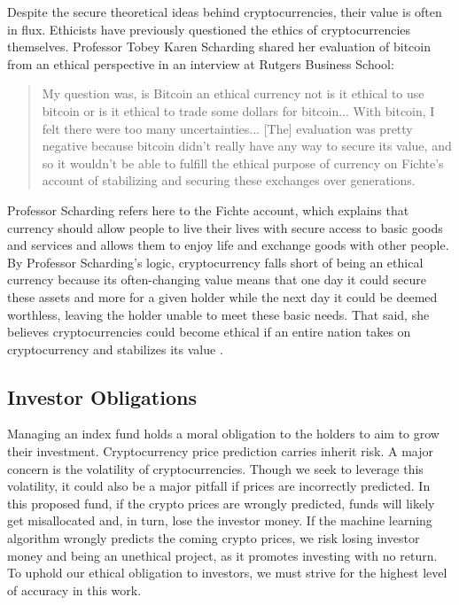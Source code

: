 \documentclass[10pt,twocolumn]{article}
\begin{document}
Despite the secure theoretical ideas behind cryptocurrencies, their value is often in flux. Ethicists have previously questioned the ethics of cryptocurrencies themselves. Professor Tobey Karen Scharding shared her evaluation of bitcoin from an ethical perspective in an interview at Rutgers Business School:

\begin{quote}
    My question was, is Bitcoin an ethical currency not is it ethical to use bitcoin or is it ethical to trade some dollars for bitcoin... With bitcoin, I felt there were too many uncertainties... [The] evaluation was pretty negative because bitcoin didn't really have any way to secure its value, and so it wouldn't be able to fulfill the ethical purpose of currency on Fichte's account of stabilizing and securing these exchanges over generations. \cite{IsBitcoinEthical}
\end{quote}

Professor Scharding refers here to the Fichte account, which explains that currency should allow people to live their lives with secure access to basic goods and services and allows them to enjoy life and exchange goods with other people. By Professor Scharding's logic, cryptocurrency falls short of being an ethical currency because its often-changing value means that one day it could secure these assets and more for a given holder while the next day it could be deemed worthless, leaving the holder unable to meet these basic needs. That said, she believes cryptocurrencies could become ethical if an entire nation takes on cryptocurrency and stabilizes its value \cite{IsBitcoinEthical}.

\subsection{Investor Obligations}

Managing an index fund holds a moral obligation to the holders to aim to grow their investment. Cryptocurrency price prediction carries inherit risk. A major concern is the volatility of cryptocurrencies. Though we seek to leverage this volatility, it could also be a major pitfall if prices are incorrectly predicted. In this proposed fund, if the crypto prices are wrongly predicted, funds will likely get misallocated and, in turn, lose the investor money. If the machine learning algorithm wrongly predicts the coming crypto prices, we risk losing investor money and being an unethical project, as it promotes investing with no return. To uphold our ethical obligation to investors, we must strive for the highest level of accuracy in this work.
\end{document}
